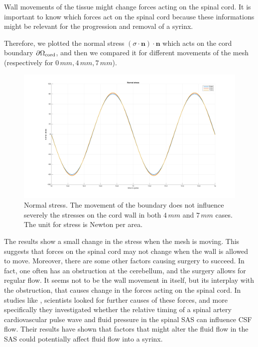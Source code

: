\documentclass[a4paper,11pt,openright,twoside]{book}
\begin{document}
Wall movements of the tissue might change forces acting on the spinal cord. It is important to know which forces act on the spinal cord because these informations might be relevant for the progression and removal of a syrinx. 


Therefore, we plotted the normal stress $(\sigma \cdot \mathbf{n}) \cdot \mathbf{n}$ which acts on the cord boundary $\partial \Omega_{\rm cord}$, and then we compared it for different movements of the mesh (respectively for $0 \, mm, 4 \, mm, 7 \, mm$).

\begin{figure}[h!]
\centering
\includegraphics[width=\textwidth]{images/normal_stress.png}
\caption{Normal stress. The movement of the boundary does not influence severely the stresses on the cord wall in both $4 \, mm$ and $7 \, mm$ cases. The unit for stress is Newton per area.}
\end{figure}

The results show a small change in the stress when the mesh is moving. This suggests that forces on the spinal cord may not change when the wall is allowed to move. Moreover, there are some other factors causing surgery to succeed. In fact, one often has an obstruction at the cerebellum, and the surgery allows for regular flow. It seems not to be the wall movement in itself, but its interplay with the obstruction, that causes change in the forces acting on the spinal cord. In studies like \cite{bilston}, scientists looked for further causes of these forces, and more specifically they investigated whether the relative timing of a spinal artery cardiovascular pulse wave and fluid pressure in the spinal SAS can influence CSF flow. Their results have shown that factors that might alter the fluid flow in the SAS could potentially affect fluid flow into a syrinx.
\end{document}
